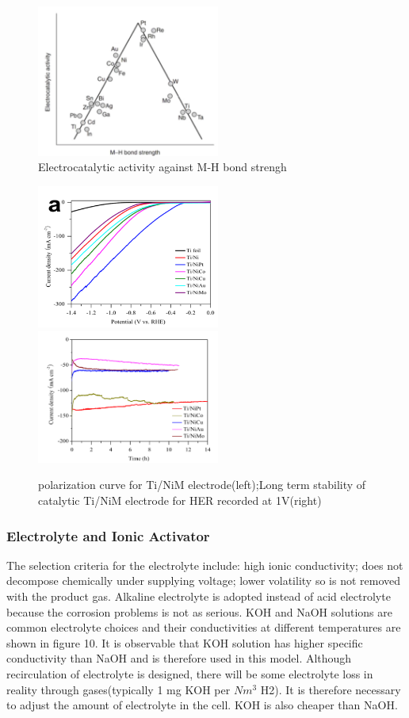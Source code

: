 \begin{figure}[H] 
\centering
\includegraphics[width=6cm]{catalyst.png}
\caption{Electrocatalytic activity against M-H bond strengh\cite{cathode2}}
\end{figure}

\begin{figure}[H] 
\centering
\includegraphics[width=6cm]{polarization.png}
\includegraphics[width=6cm]{stability.png}
\caption{polarization curve for Ti/NiM electrode(left);Long term stability of catalytic Ti/NiM electrode for HER recorded at 1V(right) \cite{cathode}}
\end{figure}


\subsubsection{Electrolyte and Ionic Activator}
The selection criteria for the electrolyte include: high ionic conductivity;  does not decompose chemically under supplying voltage; lower volatility so is not removed with the product gas. Alkaline electrolyte is adopted instead of acid electrolyte because the corrosion problems is not as serious. KOH and NaOH solutions are common electrolyte choices and their conductivities at different temperatures are shown in figure 10. It is observable that KOH solution has higher specific conductivity than NaOH and is therefore used in this model. Although recirculation of electrolyte is designed, there will be some electrolyte loss in reality through gases(typically 1 mg KOH per $Nm^3$ H2). It is therefore necessary to adjust the amount of electrolyte in the cell. KOH is also cheaper than NaOH.

